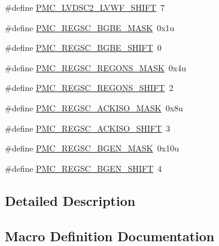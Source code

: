 \begin{DoxyCompactItemize}
\item 
\#define \hyperlink{group___p_m_c___register___masks_ga8bcfb9fc5fd4a92164b2aa6cdb6db77e}{P\+M\+C\+\_\+\+L\+V\+D\+S\+C2\+\_\+\+L\+V\+W\+F\+\_\+\+S\+H\+I\+FT}~7
\item 
\#define \hyperlink{group___p_m_c___register___masks_ga98cf5c98c133e20fb620faa6ca29d98e}{P\+M\+C\+\_\+\+R\+E\+G\+S\+C\+\_\+\+B\+G\+B\+E\+\_\+\+M\+A\+SK}~0x1u
\item 
\#define \hyperlink{group___p_m_c___register___masks_ga2e23aa8155158c86fc53ccd8baccf24d}{P\+M\+C\+\_\+\+R\+E\+G\+S\+C\+\_\+\+B\+G\+B\+E\+\_\+\+S\+H\+I\+FT}~0
\item 
\#define \hyperlink{group___p_m_c___register___masks_gab830f2c82eef6d0db7caab8ee5689ba6}{P\+M\+C\+\_\+\+R\+E\+G\+S\+C\+\_\+\+R\+E\+G\+O\+N\+S\+\_\+\+M\+A\+SK}~0x4u
\item 
\#define \hyperlink{group___p_m_c___register___masks_ga06b4e6d970f2610a635c92bb1270541d}{P\+M\+C\+\_\+\+R\+E\+G\+S\+C\+\_\+\+R\+E\+G\+O\+N\+S\+\_\+\+S\+H\+I\+FT}~2
\item 
\#define \hyperlink{group___p_m_c___register___masks_ga35ced6f0f133b2d5892bdcba3e0b2832}{P\+M\+C\+\_\+\+R\+E\+G\+S\+C\+\_\+\+A\+C\+K\+I\+S\+O\+\_\+\+M\+A\+SK}~0x8u
\item 
\#define \hyperlink{group___p_m_c___register___masks_gad2b9b6ce6aa455e8607fd3c2d1647544}{P\+M\+C\+\_\+\+R\+E\+G\+S\+C\+\_\+\+A\+C\+K\+I\+S\+O\+\_\+\+S\+H\+I\+FT}~3
\item 
\#define \hyperlink{group___p_m_c___register___masks_ga7e1520a56f4d2675018d5efaa9492f19}{P\+M\+C\+\_\+\+R\+E\+G\+S\+C\+\_\+\+B\+G\+E\+N\+\_\+\+M\+A\+SK}~0x10u
\item 
\#define \hyperlink{group___p_m_c___register___masks_gab43d258e6864ee3a7a728de1d720f6fe}{P\+M\+C\+\_\+\+R\+E\+G\+S\+C\+\_\+\+B\+G\+E\+N\+\_\+\+S\+H\+I\+FT}~4
\end{DoxyCompactItemize}


\subsection{Detailed Description}


\subsection{Macro Definition Documentation}
\mbox{\label{group___p_m_c___register___masks_ga65d04677ca16ad916563d6673cb8ecaa}} 
